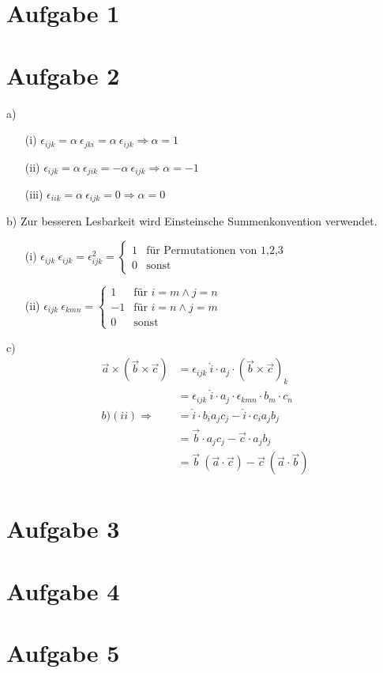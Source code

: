 \documentclass[11pt a4paper]{article}
\begin{document}
\thispagestyle{fancy}
\section*{Aufgabe 1}

\newpage
\setlength{\headheight}{0cm}

\section*{Aufgabe 2}
a)
\begin{enumerate}
	\item[(i)] 
		$ \epsilon_{ijk} 
		= \alpha \ \epsilon_{jki} 
		= \alpha \ \epsilon_{ijk}
		\Rightarrow \alpha = 1$
	\item[(ii)]
		$ \epsilon_{ijk} 
		= \alpha \ \epsilon_{jik} 
		= -\alpha \ \epsilon_{ijk}
		\Rightarrow \alpha = -1$
	\item[(iii)]
		$ \epsilon_{iik} 
		= \alpha \ \epsilon_{ijk} 
		= 0
		\Rightarrow \alpha = 0$
\end{enumerate}
\vspace{0.5cm}
b) Zur besseren Lesbarkeit wird Einsteinsche Summenkonvention verwendet.
\begin{enumerate}
	\item[(i)]
		$ \epsilon_{ijk} \ \epsilon_{ijk} = \epsilon_{ijk}^2
		= \begin{cases} 
			1 & \text{für Permutationen von 1,2,3} \\
			0 & \text{sonst}
		\end{cases} $
	\item[(ii)]
		$ \epsilon_{ijk} \ \epsilon_{kmn} =
		\begin{cases}
			1 & \text{für }  i=m \wedge j=n \\
			-1 & \text{für } i=n \wedge j=m \\
			0 & \text{sonst} 
		\end{cases} $
\end{enumerate}
\vspace{0.5cm}
c)
\begin{align*}
	\vec a \times (\vec b \times \vec c)
	&= \epsilon_{ijk} \ \hat i \cdot a_j \cdot (\vec b \times \vec c)_k
	\\
	&= \epsilon_{ijk} \ \hat i \cdot a_j \cdot 
	\epsilon_{kmn} \cdot b_m \cdot c_n
	\\
	b)(ii) \Rightarrow
	&= \hat i \cdot b_i a_j c_j - \hat i \cdot c_i a_j b_j
	\\
	&= \vec b \cdot a_j c_j - \vec c \cdot  a_j b_j
	\\
	&= \vec b \ (\vec a \cdot \vec c) - \vec c \ (\vec a \cdot \vec b)
	\\
\end{align*}

\newpage
\section*{Aufgabe 3}
\newpage
\section*{Aufgabe 4}
\newpage
\section*{Aufgabe 5}
\newpage
\end{document}

